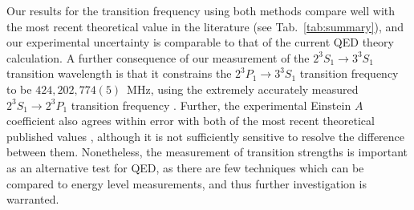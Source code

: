 \documentclass[%
 reprint,
 amsmath,amssymb,
 aps,
 prl,
]{revtex4-2}
\newcommand{\UpperState}{3^{3\!}S_1}%
\newcommand{\MetastableState}{2^{3\!}S_1}%
\begin{document}
Our results for the transition frequency using both methods compare well with the most recent theoretical value in the literature (see Tab.~\ref{tab:summary}), and our experimental uncertainty is comparable to that of the current QED theory calculation.  A further consequence of our measurement of the \(\MetastableState \rightarrow \UpperState\) transition wavelength is that it constrains the \(2^{3\!}P_1 \rightarrow \UpperState\) transition frequency to be \(424,202,774(5)\)~MHz, using the extremely accurately measured \(\MetastableState \rightarrow 2^{3\!}P_1\) transition frequency \cite{PhysRevLett.119.263002}. Further, the experimental Einstein \(A\) coefficient also agrees within error with both of the most recent theoretical published values \cite{PhysRevA.58.4453,PhysRevA.64.042510}, although it is not sufficiently sensitive to resolve the difference between them. Nonetheless, the measurement of transition strengths is important as an alternative test for QED, as there are few techniques which can be compared to energy level measurements, and thus further investigation is warranted.
\end{document}
